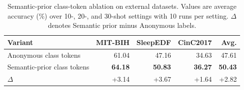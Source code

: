 \begin{table}[t]
\centering
\caption{Semantic-prior class-token ablation on external datasets. Values are average accuracy (\%) over 10-, 20-, and 30-shot settings with 10 runs per setting. $\Delta$ denotes Semantic prior minus Anonymous labels.}
\label{tab:semantic-prior-summary}
\begin{tabular}{lrrrr}
\toprule
Variant & MIT-BIH & SleepEDF & CinC2017 & Avg. \\
\midrule
Anonymous class tokens & 61.04 & 47.16 & 34.63 & 47.61 \\
Semantic-prior class tokens & \textbf{64.18} & \textbf{50.83} & \textbf{36.27} & \textbf{50.43} \\
\midrule
$\Delta$ & +3.14 & +3.67 & +1.64 & +2.82 \\
\bottomrule
\end{tabular}
\end{table}
